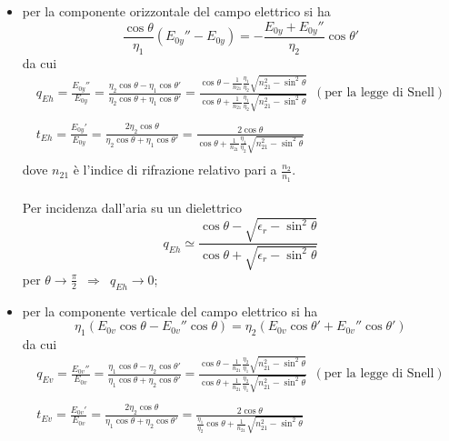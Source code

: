 \documentclass[a4paper]{article}
\begin{document}
\begin{itemize}
\item per la componente orizzontale del campo elettrico si ha
\begin{equation*}
\frac{\cos\theta}{\eta_1}(E_{0y}''-E_{0y})=-\frac{E_{0y}+E_{0y}''}{\eta_2}\cos\theta'
\end{equation*}
da cui
\begin{equation*}
\begin{array}{lr}
q_{Eh}=\frac{E_{0y}''}{E_{0y}}=\frac{\eta_2\cos\theta-\eta_1\cos\theta'}{\eta_2\cos\theta+\eta_1\cos\theta'}=\frac{\cos\theta-\frac{1}{n_{21}}\frac{\eta_1}{\eta_2}\sqrt{n_{21}^2-\sin^2\theta}}{\cos\theta+\frac{1}{n_{21}}\frac{\eta_1}{\eta_2}\sqrt{n_{21}^2-\sin^2\theta}}\,\,\,(\text{per la legge di Snell})\\\\
t_{Eh}=\frac{E_{0y}'}{E_{0y}}=\frac{2\eta_2\cos\theta}{\eta_2\cos\theta+\eta_1\cos\theta'}=\frac{2\cos\theta}{\cos\theta+\frac{1}{n_{21}}\frac{\eta_1}{\eta_2}\sqrt{n_{21}^2-\sin^2\theta}}\\
\end{array}
\end{equation*}
dove $n_{21}$ è l'indice di rifrazione relativo pari a $\frac{n_2}{n_1}$.\\\\
Per incidenza dall'aria su un dielettrico
\begin{equation*}
q_{Eh}\simeq\frac{\cos\theta-\sqrt{\epsilon_r-\sin^2\theta}}{\cos\theta+\sqrt{\epsilon_r-\sin^2\theta}}
\end{equation*}
per $\theta\rightarrow\frac{\pi}{2}\,\,\,\Rightarrow\,\,\,q_{Eh}\rightarrow0$;
\item per la componente verticale del campo elettrico si ha
\begin{equation*}
\eta_1(E_{0v}\cos\theta-E_{0v}''\cos\theta)=\eta_2(E_{0v}\cos\theta'+E_{0v}''\cos\theta')
\end{equation*}
da cui
\begin{equation*}
\begin{array}{lr}
q_{Ev}=\frac{E_{0v}''}{E_{0v}}=\frac{\eta_1\cos\theta-\eta_2\cos\theta'}{\eta_1\cos\theta+\eta_2\cos\theta'}=\frac{\cos\theta-\frac{1}{n_{21}}\frac{\eta_2}{\eta_1}\sqrt{n_{21}^2-\sin^2\theta}}{\cos\theta+\frac{1}{n_{21}}\frac{\eta_2}{\eta_1}\sqrt{n_{21}^2-\sin^2\theta}}\,\,\,(\text{per la legge di Snell})\\\\
t_{Ev}=\frac{E_{0v}'}{E_{0v}}=\frac{2\eta_2\cos\theta}{\eta_1\cos\theta+\eta_2\cos\theta'}=\frac{2\cos\theta}{\frac{\eta_1}{\eta_2}\cos\theta+\frac{1}{n_{21}}\sqrt{n_{21}^2-\sin^2\theta}}\\

\end{array}
\end{equation*}
\end{itemize}
\end{document}
